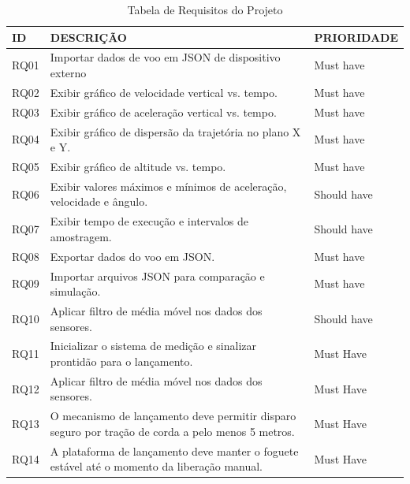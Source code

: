 \begin{samepage}
\begin{table}[H]
\centering
\scriptsize
\setlength{\tabcolsep}{4pt}
\caption{Tabela de Requisitos do Projeto}
\begin{tabular}{|l|p{8cm}|l|}
\hline
\textbf{ID} & \textbf{DESCRIÇÃO} & \textbf{PRIORIDADE} \\
\hline
RQ01 & Importar dados de voo em JSON de dispositivo externo & Must have \\
\hline
RQ02 & Exibir gráfico de velocidade vertical vs. tempo. & Must have \\
\hline
RQ03 & Exibir gráfico de aceleração vertical vs. tempo. & Must have \\
\hline
RQ04 & Exibir gráfico de dispersão da trajetória no plano X e Y. & Must have \\
\hline
RQ05 & Exibir gráfico de altitude vs. tempo. & Must have \\
\hline
RQ06 & Exibir valores máximos e mínimos de aceleração, velocidade e ângulo. & Should have \\
\hline
RQ07 & Exibir tempo de execução e intervalos de amostragem. & Should have \\
\hline
RQ08 & Exportar dados do voo em JSON. & Must have \\
\hline
RQ09 & Importar arquivos JSON para comparação e simulação. & Must have \\
\hline
RQ10 & Aplicar filtro de média móvel nos dados dos sensores. & Should have \\
\hline
RQ11 & Inicializar o sistema de medição e sinalizar prontidão para o lançamento. & Must Have \\
\hline
RQ12 & Aplicar filtro de média móvel nos dados dos sensores. & Must Have \\
\hline
RQ13 & O mecanismo de lançamento deve permitir disparo seguro por tração de corda a pelo menos 5 metros. & Must Have \\
\hline
RQ14 & A plataforma de lançamento deve manter o foguete estável até o momento da liberação manual. & Must Have \\
\hline
\end{tabular}
\label{tab:requisitos_projeto}
\end{table}

\end{samepage}



